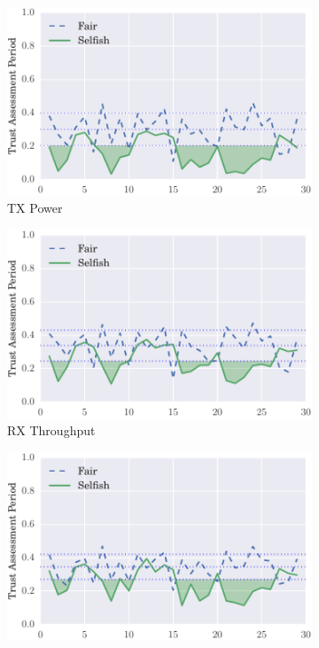 \documentclass[runningheads,a4paper]{llncs}
\begin{document}
\begin{figure}
\begin{subfigure}{0.32\textwidth}
\end{subfigure}
\begin{subfigure}{0.32\textwidth}
\centering
  \includegraphics[width=.95\linewidth]{img/trust_bella_static_emph_ATXP_BadMouthingPowerControl.pdf}
  \caption{TX Power}
  \label{fig:static_badmouthing_txp}
\end{subfigure}
\begin{subfigure}{0.32\textwidth}
\centering
  \includegraphics[width=.95\linewidth]{img/trust_bella_static_emph_RXThroughput_BadMouthingPowerControl.pdf}
  \caption{RX Throughput}
  \label{fig:static_badmouthing_rxthroughput}
\end{subfigure}
\begin{subfigure}{0.32\textwidth}
\centering
  \includegraphics[width=.95\linewidth]{img/trust_bella_static_emph_TXThroughput_BadMouthingPowerControl.pdf}

\end{subfigure}
\end{figure}
\end{document}
